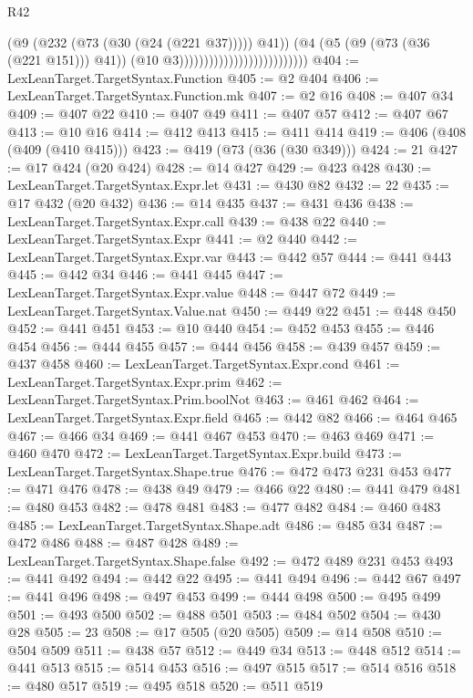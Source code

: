 \begin{lexlean}{R42}
\begin{coremodule}
                                                      (@9 (@232 (@73 (@30 (@24 (@221 @37))))) @41))
                                                    (@4
                                                      (@5 (@9 (@73 (@36 (@221 @151))) @41))
                                                      (@10 @3))))))))))))))))))))))))))
@404 := LexLeanTarget.TargetSyntax.Function
@405 := @2 @404
@406 := LexLeanTarget.TargetSyntax.Function.mk
@407 := @2 @16
@408 := @407 @34
@409 := @407 @22
@410 := @407 @49
@411 := @407 @57
@412 := @407 @67
@413 := @10 @16
@414 := @412 @413
@415 := @411 @414
@419 := @406 (@408 (@409 (@410 @415)))
@423 := @419 (@73 (@36 (@30 @349)))
@424 := 21
@427 := @17 @424 (@20 @424)
@428 := @14 @427
@429 := @423 @428
@430 := LexLeanTarget.TargetSyntax.Expr.let
@431 := @430 @82
@432 := 22
@435 := @17 @432 (@20 @432)
@436 := @14 @435
@437 := @431 @436
@438 := LexLeanTarget.TargetSyntax.Expr.call
@439 := @438 @22
@440 := LexLeanTarget.TargetSyntax.Expr
@441 := @2 @440
@442 := LexLeanTarget.TargetSyntax.Expr.var
@443 := @442 @57
@444 := @441 @443
@445 := @442 @34
@446 := @441 @445
@447 := LexLeanTarget.TargetSyntax.Expr.value
@448 := @447 @72
@449 := LexLeanTarget.TargetSyntax.Value.nat
@450 := @449 @22
@451 := @448 @450
@452 := @441 @451
@453 := @10 @440
@454 := @452 @453
@455 := @446 @454
@456 := @444 @455
@457 := @444 @456
@458 := @439 @457
@459 := @437 @458
@460 := LexLeanTarget.TargetSyntax.Expr.cond
@461 := LexLeanTarget.TargetSyntax.Expr.prim
@462 := LexLeanTarget.TargetSyntax.Prim.boolNot
@463 := @461 @462
@464 := LexLeanTarget.TargetSyntax.Expr.field
@465 := @442 @82
@466 := @464 @465
@467 := @466 @34
@469 := @441 @467 @453
@470 := @463 @469
@471 := @460 @470
@472 := LexLeanTarget.TargetSyntax.Expr.build
@473 := LexLeanTarget.TargetSyntax.Shape.true
@476 := @472 @473 @231 @453
@477 := @471 @476
@478 := @438 @49
@479 := @466 @22
@480 := @441 @479
@481 := @480 @453
@482 := @478 @481
@483 := @477 @482
@484 := @460 @483
@485 := LexLeanTarget.TargetSyntax.Shape.adt
@486 := @485 @34
@487 := @472 @486
@488 := @487 @428
@489 := LexLeanTarget.TargetSyntax.Shape.false
@492 := @472 @489 @231 @453
@493 := @441 @492
@494 := @442 @22
@495 := @441 @494
@496 := @442 @67
@497 := @441 @496
@498 := @497 @453
@499 := @444 @498
@500 := @495 @499
@501 := @493 @500
@502 := @488 @501
@503 := @484 @502
@504 := @430 @28
@505 := 23
@508 := @17 @505 (@20 @505)
@509 := @14 @508
@510 := @504 @509
@511 := @438 @57
@512 := @449 @34
@513 := @448 @512
@514 := @441 @513
@515 := @514 @453
@516 := @497 @515
@517 := @514 @516
@518 := @480 @517
@519 := @495 @518
@520 := @511 @519

\end{coremodule}
\end{lexlean}
